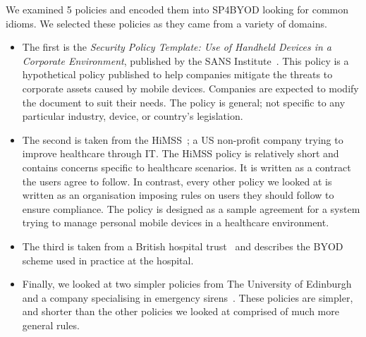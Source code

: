 \documentclass{llncs}
\newcommand{\AppPAL}[0]{SP4BYOD}
\begin{document}
We examined 5 policies and encoded them into \AppPAL{} looking for common idioms.
We selected these policies as they came from a variety of domains.
\begin{itemize}
  \item The first is the \emph{Security Policy Template: Use of Handheld Devices in a Corporate Environment}, published by the SANS Institute~\cite{nicholas_r._c._guerin_security_2008}.
This policy is a hypothetical policy published to help companies mitigate the threats to corporate assets caused by mobile devices.
Companies are expected to modify the document to suit their needs.
The policy is general; not specific to any particular industry, device, or country's legislation.
\item The second is taken from the \ac{HiMSS}~\cite{healthcare_information_and_management_systems_society_mobile_2012};
  a US non-profit company trying to improve healthcare through IT.
The \ac{HiMSS} policy is relatively short and contains concerns specific to healthcare scenarios. 
It is written as a contract the users agree to follow.
In contrast, every other policy we looked at is written as an organisation imposing rules on users they should follow to ensure compliance.
The policy is designed as a sample agreement for a system trying to manage personal mobile devices in a healthcare environment.
\item The third is taken from a British hospital trust~\cite{kennington_mobiles_2014} and describes the BYOD scheme used in practice at the hospital.
\item Finally, we looked at two simpler policies from The University of Edinburgh~\cite{williamson_bring_2015} and a company specialising in emergency sirens~\cite{code3pse.org_sample_????}.
  These policies are simpler, and shorter than the other policies we looked at comprised of much more general rules.
\end{itemize}
\end{document}
